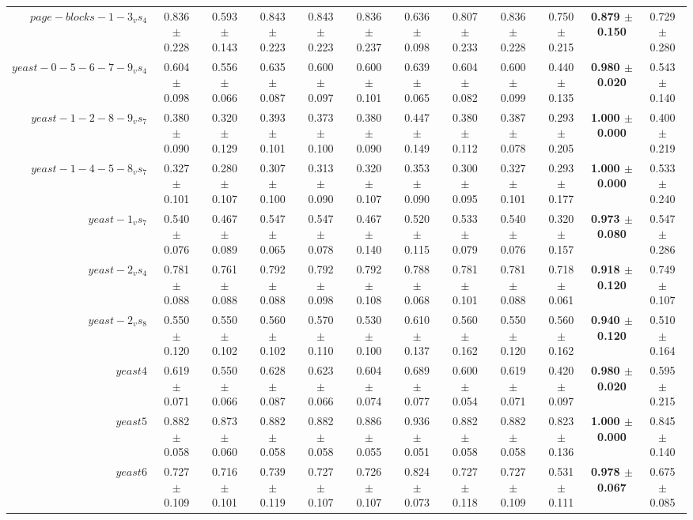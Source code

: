 \begin{table}[!ht]
{\begin{tabular}{r c c c c c c c c c c c}
$page-blocks-1-3_vs_4$ & 0.836 $\pm$ 0.228 & 0.593 $\pm$ 0.143 & 0.843 $\pm$ 0.223 & 0.843 $\pm$ 0.223 & 0.836 $\pm$ 0.237 & 0.636 $\pm$ 0.098 & 0.807 $\pm$ 0.233 & 0.836 $\pm$ 0.228 & 0.750 $\pm$ 0.215 & \textbf{0.879 $\pm$ 0.150} & 0.729 $\pm$ 0.280 \\
$yeast-0-5-6-7-9_vs_4$ & 0.604 $\pm$ 0.098 & 0.556 $\pm$ 0.066 & 0.635 $\pm$ 0.087 & 0.600 $\pm$ 0.097 & 0.600 $\pm$ 0.101 & 0.639 $\pm$ 0.065 & 0.604 $\pm$ 0.082 & 0.600 $\pm$ 0.099 & 0.440 $\pm$ 0.135 & \textbf{0.980 $\pm$ 0.020} & 0.543 $\pm$ 0.140 \\
$yeast-1-2-8-9_vs_7$ & 0.380 $\pm$ 0.090 & 0.320 $\pm$ 0.129 & 0.393 $\pm$ 0.101 & 0.373 $\pm$ 0.100 & 0.380 $\pm$ 0.090 & 0.447 $\pm$ 0.149 & 0.380 $\pm$ 0.112 & 0.387 $\pm$ 0.078 & 0.293 $\pm$ 0.205 & \textbf{1.000 $\pm$ 0.000} & 0.400 $\pm$ 0.219 \\
$yeast-1-4-5-8_vs_7$ & 0.327 $\pm$ 0.101 & 0.280 $\pm$ 0.107 & 0.307 $\pm$ 0.100 & 0.313 $\pm$ 0.090 & 0.320 $\pm$ 0.107 & 0.353 $\pm$ 0.090 & 0.300 $\pm$ 0.095 & 0.327 $\pm$ 0.101 & 0.293 $\pm$ 0.177 & \textbf{1.000 $\pm$ 0.000} & 0.533 $\pm$ 0.240 \\
$yeast-1_vs_7$ & 0.540 $\pm$ 0.076 & 0.467 $\pm$ 0.089 & 0.547 $\pm$ 0.065 & 0.547 $\pm$ 0.078 & 0.467 $\pm$ 0.140 & 0.520 $\pm$ 0.115 & 0.533 $\pm$ 0.079 & 0.540 $\pm$ 0.076 & 0.320 $\pm$ 0.157 & \textbf{0.973 $\pm$ 0.080} & 0.547 $\pm$ 0.286 \\
$yeast-2_vs_4$ & 0.781 $\pm$ 0.088 & 0.761 $\pm$ 0.088 & 0.792 $\pm$ 0.088 & 0.792 $\pm$ 0.098 & 0.792 $\pm$ 0.108 & 0.788 $\pm$ 0.068 & 0.781 $\pm$ 0.101 & 0.781 $\pm$ 0.088 & 0.718 $\pm$ 0.061 & \textbf{0.918 $\pm$ 0.120} & 0.749 $\pm$ 0.107 \\
$yeast-2_vs_8$ & 0.550 $\pm$ 0.120 & 0.550 $\pm$ 0.102 & 0.560 $\pm$ 0.102 & 0.570 $\pm$ 0.110 & 0.530 $\pm$ 0.100 & 0.610 $\pm$ 0.137 & 0.560 $\pm$ 0.162 & 0.550 $\pm$ 0.120 & 0.560 $\pm$ 0.162 & \textbf{0.940 $\pm$ 0.120} & 0.510 $\pm$ 0.164 \\
$yeast4$ & 0.619 $\pm$ 0.071 & 0.550 $\pm$ 0.066 & 0.628 $\pm$ 0.087 & 0.623 $\pm$ 0.066 & 0.604 $\pm$ 0.074 & 0.689 $\pm$ 0.077 & 0.600 $\pm$ 0.054 & 0.619 $\pm$ 0.071 & 0.420 $\pm$ 0.097 & \textbf{0.980 $\pm$ 0.020} & 0.595 $\pm$ 0.215 \\
$yeast5$ & 0.882 $\pm$ 0.058 & 0.873 $\pm$ 0.060 & 0.882 $\pm$ 0.058 & 0.882 $\pm$ 0.058 & 0.886 $\pm$ 0.055 & 0.936 $\pm$ 0.051 & 0.882 $\pm$ 0.058 & 0.882 $\pm$ 0.058 & 0.823 $\pm$ 0.136 & \textbf{1.000 $\pm$ 0.000} & 0.845 $\pm$ 0.140 \\
$yeast6$ & 0.727 $\pm$ 0.109 & 0.716 $\pm$ 0.101 & 0.739 $\pm$ 0.119 & 0.727 $\pm$ 0.107 & 0.726 $\pm$ 0.107 & 0.824 $\pm$ 0.073 & 0.727 $\pm$ 0.118 & 0.727 $\pm$ 0.109 & 0.531 $\pm$ 0.111 & \textbf{0.978 $\pm$ 0.067} & 0.675 $\pm$ 0.085 \\

\end{tabular}}
\end{table}
